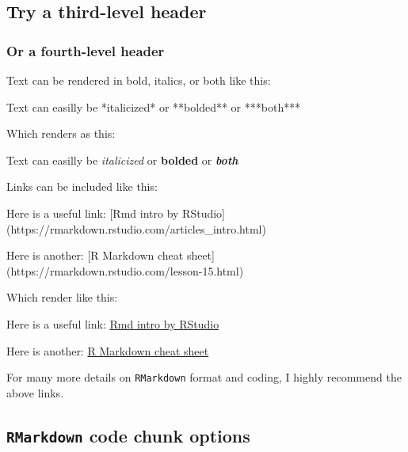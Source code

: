 \documentclass[]{book}
\newenvironment{Shaded}{\begin{snugshade}}{\end{snugshade}}
\newcommand{\ExtensionTok}[1]{#1}
\newcommand{\NormalTok}[1]{#1}
\begin{document}
\hypertarget{try-a-third-level-header}{%
\subsection{Try a third-level header}\label{try-a-third-level-header}}

\hypertarget{or-a-fourth-level-header}{%
\subsubsection{Or a fourth-level header}\label{or-a-fourth-level-header}}

Text can be rendered in bold, italics, or both like this:

\begin{Shaded}
\begin{Highlighting}[]
\ExtensionTok{Text}\NormalTok{ can easilly be *italicized* or **bolded** or ***both***}
\end{Highlighting}
\end{Shaded}

Which renders as this:

Text can easilly be \emph{italicized} or \textbf{bolded} or \textbf{\emph{both}}

Links can be included like this:

\begin{Shaded}
\begin{Highlighting}[]
\ExtensionTok{Here}\NormalTok{ is a useful link: [Rmd intro by RStudio](https://rmarkdown.rstudio.com/articles_intro.html)}

\ExtensionTok{Here}\NormalTok{ is another: [R Markdown cheat sheet](https://rmarkdown.rstudio.com/lesson-15.html)}
\end{Highlighting}
\end{Shaded}

Which render like this:

Here is a useful link: \href{https://rmarkdown.rstudio.com/articles_intro.html}{Rmd intro by RStudio}

Here is another: \href{https://rmarkdown.rstudio.com/lesson-15.html}{R Markdown cheat sheet}

For many more details on \texttt{RMarkdown} format and coding, I highly recommend the above links.

\hypertarget{rmarkdown-code-chunk-options}{%
\subsection{\texorpdfstring{\texttt{RMarkdown} code chunk options}{RMarkdown code chunk options}}\label{rmarkdown-code-chunk-options}}
\end{document}
